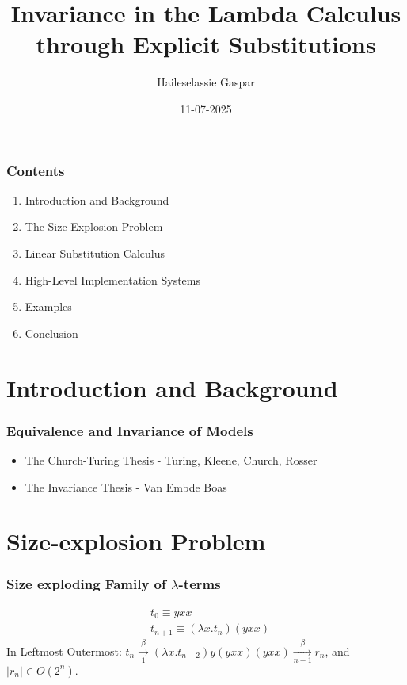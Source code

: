 \documentclass{beamer}
\title{Invariance in the Lambda Calculus through Explicit Substitutions}
\author{Haileselassie Gaspar}
\institute{Vrije Universiteit Amsterdam}
\date{11-07-2025}
\begin{document}
\frame{\titlepage}

\begin{frame}
  \frametitle{Contents}
  \begin{enumerate}
    \item Introduction and Background
    \item The Size-Explosion Problem
    \item Linear Substitution Calculus
    \item High-Level Implementation Systems
    \item Examples
    \item Conclusion
  \end{enumerate}
\end{frame}
\section{Introduction and Background}
\begin{frame}
  \frametitle{Equivalence and Invariance of Models}
  \begin{itemize}
    \item The Church-Turing Thesis - Turing, Kleene, Church, Rosser
    \item The Invariance Thesis - Van Embde Boas
  \end{itemize}
\end{frame}
\section{Size-explosion Problem}
\begin{frame}
  \frametitle{Size exploding Family of $\lambda$-terms}
  \begin{equation}
    \begin{split}
      & t_{0} \equiv yxx \\
      & t_{n+1} \equiv (\lambda x.t_{n})(yxx)
    \end{split}
  \end{equation}
  In Leftmost Outermost: $t_{n} \xrightarrow[1]{\beta} (\lambda x .t_{n - 2})y(yxx)(yxx) \xrightarrow[n-1]{\beta} r_{n}$, and $|r_{n}| \in O(2^{n})$.
\end{frame}
\end{document}
